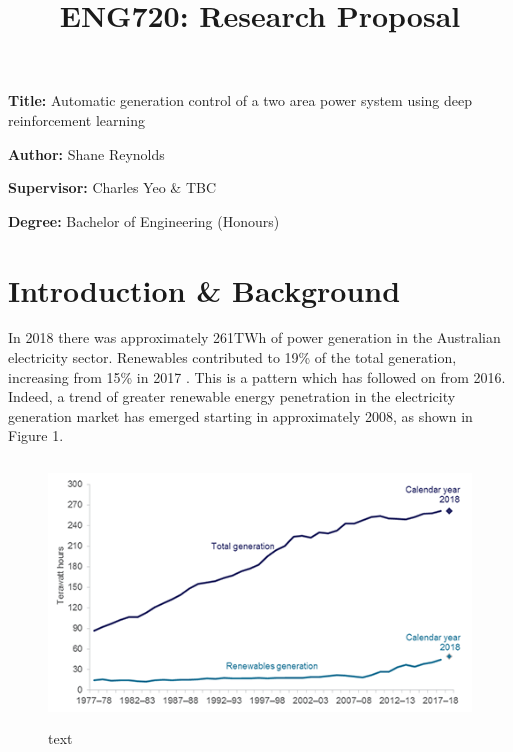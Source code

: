 \documentclass[12pt, a4paper]{article}
\title{ENG720: Research Proposal}
\author{}
\date{}
\newcommand{\namelistlabel}[1]{\mbox{#1}\hfil}
\newenvironment{namelist}[1]{%
\begin{list}{}
    {
        \let\makelabel\namelistlabel
        \settowidth{\labelwidth}{#1}
        \setlength{\leftmargin}{1.1\labelwidth}
    }
  }{%
\end{list}}
\begin{document}
\maketitle

\begin{namelist}{xxxxxxxxxxxx}
\item[{\bf Title:}]
	Automatic generation control of a two area power system using deep reinforcement learning
\item[{\bf Author:}]
	Shane Reynolds
\item[{\bf Supervisor:}]
	Charles Yeo \& TBC
\item[{\bf Degree:}]
	Bachelor of Engineering (Honours)
\end{namelist}


\tableofcontents
\newpage

\section{Introduction \& Background}
In 2018 there was approximately 261$\si{\tera\watt\hour}$ of power generation in the Australian electricity sector. Renewables contributed to 19\% of the total generation, increasing from 15\% in 2017 \cite{Gov202002}. This is a pattern which has followed on from 2016. Indeed, a trend of greater renewable energy penetration in the electricity generation market has emerged starting in approximately 2008, as shown in Figure 1.
\begin{figure}[h]
	\centering
	\includegraphics[height=7cm]{australian_generation_profile}
	\caption{text}
\end{figure}
\end{document}
